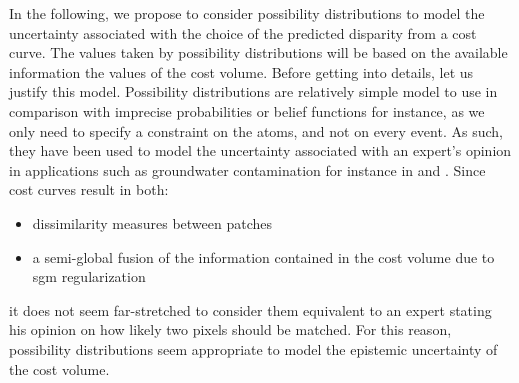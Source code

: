 In the following, we propose to consider possibility distributions to model the uncertainty associated with the choice of the predicted disparity from a cost curve. The values taken by possibility distributions will be based on the available information \ie the values of the cost volume. Before getting into details, let us justify this model. Possibility distributions are relatively simple model to use in comparison with imprecise probabilities or belief functions for instance, as we only need to specify a constraint on the atoms, and not on every event. As such, they have been used to model the uncertainty associated with an expert's opinion in applications such as groundwater contamination for instance in \cite{bardossy_l-_1995} and \cite{baudrit_joint_2007}. Since cost curves result in both:
\begin{itemize}
	\item dissimilarity measures between patches 
	\item a semi-global fusion of the information contained in the cost volume due to \acrshort{sgm} regularization
\end{itemize}it does not seem far-stretched to consider them equivalent to an expert stating his opinion on how likely two pixels should be matched. For this reason, possibility distributions seem appropriate to model the epistemic uncertainty of the cost volume.

